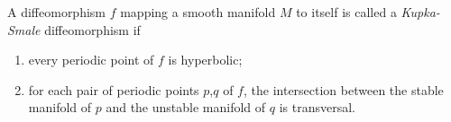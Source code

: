 \documentclass[12pt]{article}
\begin{document}
A diffeomorphism $f$ mapping a smooth manifold $M$ to itself is called a \emph{Kupka-Smale} diffeomorphism if 
\begin{enumerate}
\item every periodic point of $f$ is hyperbolic;
\item for each pair of periodic points $p$,$q$ of $f$, the intersection between the stable manifold of $p$ and the unstable manifold of $q$ is transversal.
\end{enumerate}
\end{document}
